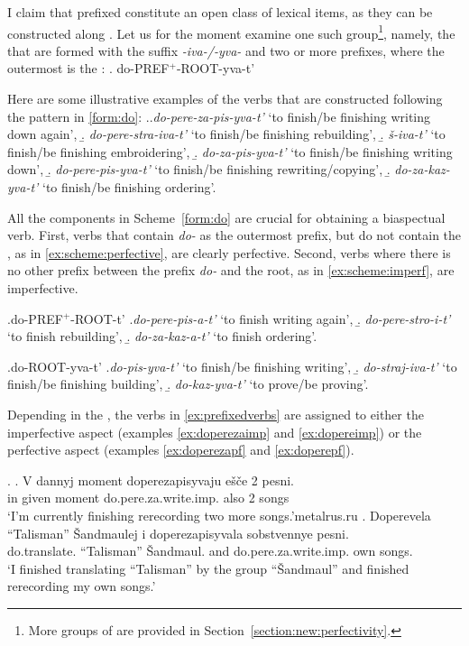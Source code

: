 I claim that prefixed  constitute an open class of lexical items, as they can be constructed along . Let us for the moment examine one such group\footnote{More groups of  are provided in Section~\ref{section:new:perfectivity}.}, namely, the  that are formed with the suffix \textit{-iva-/-yva-} and two or more prefixes, where the outermost is the :
\ex. \label{form:do}do-PREF$^{+}$-ROOT-yva-t'

Here are some illustrative examples of the verbs that are constructed following the pattern in \ref{form:do}: 
\ex.\label{ex:prefixedverbs}\a.\textit{do-pere-za-pis-yva-t'} `to finish/be finishing writing down again', 
\b. \textit{do-pere-stra-iva-t'} `to finish/be finishing rebuilding',
\b. \textit{\v{s}-iva-t'} `to finish/be finishing embroidering',
\b. \textit{do-za-pis-yva-t'} `to finish/be finishing writing down', 
\b. \textit{do-pere-pis-yva-t'} `to finish/be finishing rewriting/copying', 
\b. \textit{do-za-kaz-yva-t'} `to finish/be finishing ordering'.

All the components in Scheme~\ref{form:do} are crucial for obtaining a biaspectual verb. First, verbs that contain \textit{do-} as the outermost prefix, but do not contain the , as in \ref{ex:scheme:perfective}, are clearly perfective. Second, verbs where there is no other prefix between the prefix \textit{do-} and the root, as in \ref{ex:scheme:imperf}, are imperfective.

\ex.\label{ex:scheme:perfective}do-PREF$^{+}$-ROOT-t'
\a.\textit{do-pere-pis-a-t'}\textsuperscript{\PF} `to finish writing again', 
\b. \textit{do-pere-stro-i-t'}\textsuperscript{\PF} `to finish rebuilding',
\b. \textit{do-za-kaz-a-t'}\textsuperscript{\PF} `to finish ordering'.

\ex.\label{ex:scheme:imperf}do-ROOT-yva-t'
\a.\textit{do-pis-yva-t'}\textsuperscript{\IPF} `to finish/be finishing writing', 
\b. \textit{do-straj-iva-t'}\textsuperscript{\IPF} `to finish/be finishing building',
\b. \textit{do-kaz-yva-t'}\textsuperscript{\IPF} `to prove/be proving'.

Depending in the , the verbs in \ref{ex:prefixedverbs} are assigned to either the imperfective aspect (examples \ref{ex:doperezaimp} and \ref{ex:dopereimp}) or the perfective aspect (examples \ref{ex:doperezapf} and \ref{ex:doperepf}). 

\ex. \ag. \label{ex:doperezaimp}V dannyj moment doperezapisyvaju e\v{s}\v{c}e 2 pesni.\\
in given moment do.pere.za.write.imp. also 2 songs\\
\trans `I'm currently finishing rerecording two more songs.'\hfill metalrus.ru
\bg. \label{ex:doperezapf}Doperevela ``Talisman'' \v{S}andmaulej i doperezapisyvala sobstvennye pesni.\\
do.translate. ``Talisman'' \v{S}andmaul. and do.pere.za.write.imp. own songs.\\
\trans `I finished translating ``Talisman'' by the group ``\v{S}andmaul'' and finished rerecording my own songs.'

